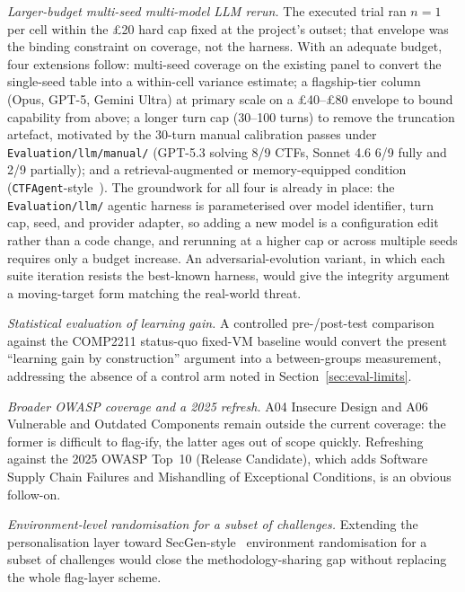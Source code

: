 \textit{Larger-budget multi-seed multi-model LLM rerun.} The
executed trial ran $n=1$ per cell within the
\pounds20 hard cap fixed at the project's outset; that envelope
was the binding constraint on coverage, not the harness. With
an adequate budget, four extensions follow: multi-seed coverage
on the existing panel to
convert the single-seed table into a within-cell variance
estimate; a flagship-tier column (Opus, GPT-5, Gemini Ultra) at
primary scale on a \pounds40--\pounds80 envelope to bound
capability from above; a longer turn cap (30--100 turns) to remove the truncation
artefact, motivated by the 30-turn manual calibration passes
under \texttt{Evaluation/llm/manual/} (GPT-5.3 solving 8/9
CTFs, Sonnet 4.6 6/9 fully and 2/9 partially); and a
retrieval-augmented or memory-equipped condition
(\texttt{CTFAgent}-style~\cite{ji2025}). The groundwork for all
four is already in place: the \texttt{Evaluation/llm/} agentic
harness is parameterised over model identifier, turn cap, seed,
and provider adapter, so adding a new model is a configuration
edit rather than a code change, and rerunning at a higher cap
or across multiple seeds requires only a budget increase. An
adversarial-evolution variant, in which each suite iteration
resists the best-known harness, would give the integrity
argument a moving-target form matching the real-world threat.

\textit{Statistical evaluation of learning gain.} A controlled
pre-/post-test comparison against the COMP2211 status-quo
fixed-VM baseline would convert the present
``learning gain by construction'' argument into a
between-groups measurement, addressing the absence of a
control arm noted in Section~\ref{sec:eval-limits}.

\textit{Broader OWASP coverage and a 2025 refresh.} A04
Insecure Design and A06 Vulnerable and Outdated Components
remain outside the current coverage: the former is
difficult to flag-ify, the latter ages out of scope quickly.
Refreshing against the 2025 OWASP Top~10 (Release
Candidate), which adds Software Supply Chain Failures and
Mishandling of Exceptional Conditions, is an obvious
follow-on.

\textit{Environment-level randomisation for a subset of
challenges.} Extending the personalisation layer toward
SecGen-style~\cite{secgen2017} environment randomisation for a
subset of challenges would close the methodology-sharing gap
without replacing the whole flag-layer scheme.

